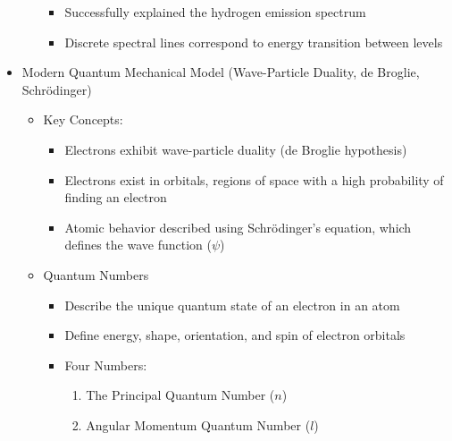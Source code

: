 \begin{itemize}
\begin{itemize}
\begin{itemize}
          \item Successfully explained the hydrogen emission spectrum

          \item Discrete spectral lines correspond to energy transition between levels

        \end{itemize}

    \end{itemize}

  \item Modern Quantum Mechanical Model (Wave-Particle Duality, de Broglie, Schr\"odinger)

    \begin{itemize}

      \item Key Concepts:

        \begin{itemize}

          \item Electrons exhibit wave-particle duality (de Broglie hypothesis)

          \item Electrons exist in orbitals, regions of space with a high probability of finding an electron

          \item Atomic behavior described using Schr\"odinger's equation, which defines the wave function ($\psi$)

        \end{itemize}

      \item Quantum Numbers

        \begin{itemize}

          \item Describe the unique quantum state of an electron in an atom

          \item Define energy, shape, orientation, and spin of electron orbitals

          \item Four Numbers:

            \begin{enumerate}

              \item The Principal Quantum Number ($n$)

              \item Angular Momentum Quantum Number ($l$)


\end{enumerate}
\end{itemize}
\end{itemize}
\end{itemize}
